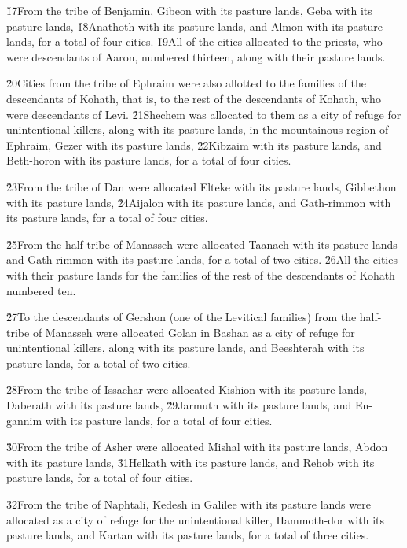 \v{17}From the tribe of Benjamin, Gibeon with its pasture lands, Geba with its pasture lands, \v{18}Anathoth with its pasture lands, and Almon with its pasture lands, for a total of four cities. \v{19}All of the cities allocated to the priests, who were descendants of Aaron, numbered thirteen, along with their pasture lands.

\v{20}Cities from the tribe of Ephraim were also allotted to the families of the descendants of Kohath, that is, to the rest of the descendants of Kohath, who were descendants of Levi. \v{21}Shechem was allocated to them as a city of refuge for unintentional killers, along with its pasture lands, in the mountainous region of Ephraim, Gezer with its pasture lands, \v{22}Kibzaim with its pasture lands, and Beth-horon with its pasture lands, for a total of four cities.

\v{23}From the tribe of Dan were allocated Elteke with its pasture lands, Gibbethon with its pasture lands, \v{24}Aijalon with its pasture lands, and Gath-rimmon with its pasture lands, for a total of four cities.

\v{25}From the half-tribe of Manasseh were allocated Taanach with its pasture lands and Gath-rimmon with its pasture lands, for a total of two cities. \v{26}All the cities with their pasture lands for the families of the rest of the descendants of Kohath numbered ten.

\v{27}To the descendants of Gershon (one of the Levitical families) from the half-tribe of Manasseh were allocated Golan in Bashan as a city of refuge for unintentional killers, along with its pasture lands, and Beeshterah with its pasture lands, for a total of two cities.

\v{28}From the tribe of Issachar were allocated Kishion with its pasture lands, Daberath with its pasture lands, \v{29}Jarmuth with its pasture lands, and En-gannim with its pasture lands, for a total of four cities.

\v{30}From the tribe of Asher were allocated Mishal with its pasture lands, Abdon with its pasture lands, \v{31}Helkath with its pasture lands, and Rehob with its pasture lands, for a total of four cities.

\v{32}From the tribe of Naphtali, Kedesh in Galilee with its pasture lands were allocated as a city of refuge for the unintentional killer, Hammoth-dor with its pasture lands, and Kartan with its pasture lands, for a total of three cities.

